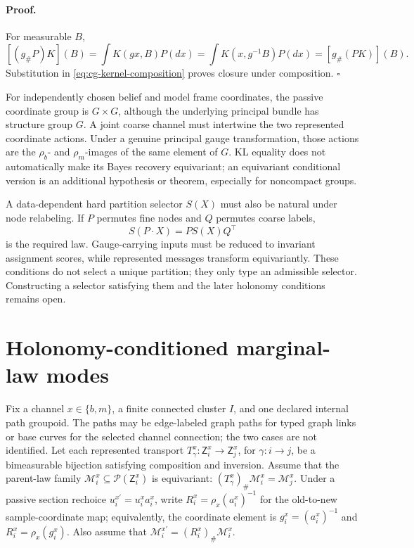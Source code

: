 \paragraph{Proof.}
For measurable \(B\),
\[
[(g_\#P)K](B)
=\int K(gx,B)P(dx)
=\int K(x,g^{-1}B)P(dx)
=[g_\#(PK)](B).
\]
Substitution in \eqref{eq:cg-kernel-composition} proves closure under
composition. \(\square\)

For independently chosen belief and model frame coordinates, the passive
coordinate group is \(G\times G\), although the underlying principal bundle
has structure group \(G\). A joint coarse channel must intertwine the two
represented coordinate actions. Under a genuine principal gauge
transformation, those actions are the \(\rho_b\)- and \(\rho_m\)-images of the
same element of \(G\).
KL equality does not automatically make its Bayes recovery equivariant; an
equivariant conditional version is an additional hypothesis or theorem,
especially for noncompact groups. 

A data-dependent hard partition selector \(S(X)\) must also be natural under
node relabeling. If \(P\) permutes fine nodes and \(Q\) permutes coarse labels,
\begin{equation}
S(P\cdot X)=PS(X)Q^\top
\label{eq:cg-partition-naturality}
\end{equation}
is the required law. Gauge-carrying inputs must be reduced to invariant
assignment scores, while represented messages transform equivariantly. These
conditions do not select a unique partition; they only type an admissible
selector. Constructing a selector satisfying them and the later holonomy
conditions remains open. 

\section{Holonomy-conditioned marginal-law modes}
\label{sec:cg-holonomy-law-modes}

Fix a channel \(x\in\{b,m\}\), a finite connected cluster \(I\), and one
declared internal path groupoid. The paths may be edge-labeled graph paths
for typed graph links or base curves for the selected channel connection;
the two cases are not identified. Let each represented transport
\(T^x_\gamma:\mathsf Z_i^x\to\mathsf Z_j^x\), for
\(\gamma:i\to j\), be a bimeasurable bijection satisfying composition and
inversion. Assume that the parent-law family
\(\mathscr M_i^x\subseteq\mathcal P(\mathsf Z_i^x)\) is equivariant:
\((T^x_\gamma)_\#\mathscr M_i^x=\mathscr M_j^x\). Under a passive section
rechoice \(u_i^{x\prime}=u_i^x a_i^x\), write
\(R_i^x=\rho_x(a_i^x)^{-1}\) for the old-to-new sample-coordinate map;
equivalently, the coordinate element is \(g_i^x=(a_i^x)^{-1}\) and
\(R_i^x=\rho_x(g_i^x)\).  Also assume that
\(\mathscr M_i^{x\prime}=(R_i^x)_\#\mathscr M_i^x\).

